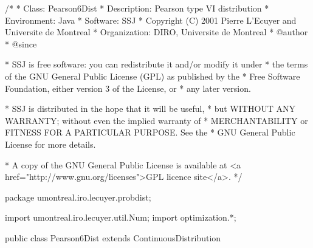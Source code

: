\begin{code}
\begin{hide}
/*
 * Class:        Pearson6Dist
 * Description:  Pearson type VI distribution
 * Environment:  Java
 * Software:     SSJ
 * Copyright (C) 2001  Pierre L'Ecuyer and Universite de Montreal
 * Organization: DIRO, Universite de Montreal
 * @author
 * @since

 * SSJ is free software: you can redistribute it and/or modify it under
 * the terms of the GNU General Public License (GPL) as published by the
 * Free Software Foundation, either version 3 of the License, or
 * any later version.

 * SSJ is distributed in the hope that it will be useful,
 * but WITHOUT ANY WARRANTY; without even the implied warranty of
 * MERCHANTABILITY or FITNESS FOR A PARTICULAR PURPOSE.  See the
 * GNU General Public License for more details.

 * A copy of the GNU General Public License is available at
   <a href="http://www.gnu.org/licenses">GPL licence site</a>.
 */
\end{hide}
package umontreal.iro.lecuyer.probdist;
\begin{hide}
import umontreal.iro.lecuyer.util.Num;
import optimization.*;
\end{hide}

public class Pearson6Dist extends ContinuousDistribution\begin{hide} {
   protected double alpha1;
   protected double alpha2;
   protected double beta;
   protected double logBeta; // Ln (Beta (alpha1, alpha2))

   private static class Optim implements Uncmin_methods {
      private int n;
      private double[] x;

      public Optim (double[] x, int n) {
         this.n = n;
         this.x = new double[n];
         System.arraycopy (x, 0, this.x, 0, n);
      }

      public double f_to_minimize (double[] param) {

         if ((param[1] <= 0.0) || (param[2] <= 0.0) || (param[3] <= 0.0))
            return 1e200;

         double sumLogY = 0.0;
         double sumLog1_Y = 0.0;
         for (int i = 0; i < n; i++)
         {
            if (x[i] > 0.0)
               sumLogY += Math.log (x[i] / param[3]);
            else
               sumLogY -= 709.0;
            sumLog1_Y += Math.log1p (x[i] / param[3]);
         }

         return (n * (Math.log (param[3]) + Num.lnBeta (param[1], param[2])) -
         (param[1] - 1.0) * sumLogY + (param[1] + param[2]) * sumLog1_Y);
      }

      public void gradient (double[] x, double[] g)
      {
      }

      public void hessian (double[] x, double[][] h)
      {
      }
   }
\end{hide}\end{code}
